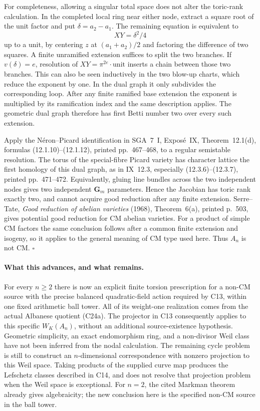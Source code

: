 For completeness, allowing a singular total space does not
alter the toric-rank calculation. In the completed local
ring near either node, extract a square root of the unit
factor and put $\delta=a_2-a_1$. The remaining equation
is equivalent to
\[
 XY=\delta^2/4
\]
up to a unit, by centering $z$ at $(a_1+a_2)/2$ and
factoring the difference of two squares. A finite unramified
extension suffices to split the two branches. If
$v(\delta)=e$, resolution of $XY=\pi^{2e}\cdot\mathrm{unit}$
inserts a chain between those two branches. This can also
be seen inductively in the two blow-up charts, which reduce
the exponent by one. In the dual graph it only subdivides
the corresponding loop. After any finite ramified base
extension the exponent is multiplied by its ramification
index and the same description applies. The geometric
dual graph therefore has first Betti number two over
every such extension.

Apply the N\'eron--Picard identification in SGA~7~I,
Expos\'e~IX, Theorem~12.1(d), formulas (12.1.10)--(12.1.12), printed pp.~467--468,
to a regular semistable resolution. The torus of the
special-fibre Picard variety has character lattice the
first homology of this dual graph, as in IX~12.3,
especially (12.3.6)--(12.3.7), printed pp.~471--472. Equivalently, gluing line
bundles across the two independent nodes gives two
independent $\mathbf G_m$ parameters. Hence the Jacobian
has toric rank exactly two, and cannot acquire good
reduction after any finite extension. Serre--Tate,
\emph{Good reduction of abelian varieties} (1968),
Theorem~6(a), printed p.~503, gives potential good
reduction for CM abelian varieties. For a product of
simple CM factors the same conclusion follows after a
common finite extension and isogeny, so it applies to
the general meaning of CM type used here. Thus $A_n$
is not CM. \hfill$\square$

\paragraph{What this advances, and what remains.}
For every $n\geq2$ there is now an explicit finite torsion
prescription for a non-CM source with the precise balanced
quadratic-field action required by C13, within one fixed
arithmetic ball tower. All of its weight-one realization
comes from the actual Albanese quotient (C24a). The
projector in C13 consequently applies to this specific
$W_K(A_n)$, without an additional source-existence
hypothesis. Geometric simplicity, an exact endomorphism
ring, and a non-divisor Weil class have not been inferred
from the nodal calculation. The remaining cycle problem
is still to construct an $n$-dimensional correspondence
with nonzero projection to this Weil space. Taking
products of the supplied curve map produces the
Lefschetz classes described in C14, and does not resolve
that projection problem when the Weil space is
exceptional. For $n=2$, the cited Markman theorem already
gives algebraicity; the new conclusion here is the
specified non-CM source in the ball tower.

